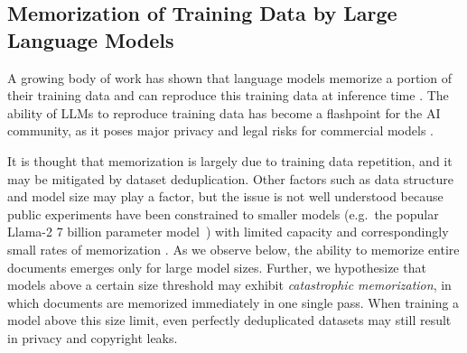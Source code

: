 
\subsection{Memorization of Training Data by Large Language Models}

A growing body of work has shown that language models memorize a portion of
their training data and can reproduce this training data at inference time
\cite{carlini2023quantifying}. The ability of LLMs to reproduce training data
has become a flashpoint for the AI community, as it poses major privacy and
legal risks for commercial models \cite{grynbaum2023times,
carlini2021extracting,carlini2023quantifying}.

It is thought that memorization is largely due to training data repetition, and
it may be mitigated by dataset deduplication. Other factors such as data
structure and model size may play a factor, but the issue is not well
understood because public experiments have been constrained to smaller models
(e.g.~the popular Llama-2 7 billion parameter model~\cite{touvron2023llama})
with limited capacity and correspondingly small rates of memorization
\cite{carlini2023quantifying,biderman2023pythia}. As we observe below, the
ability to memorize entire documents emerges only for large model
sizes. Further, we hypothesize that models above a certain size threshold
may exhibit \textit{catastrophic memorization}, in which documents are
memorized immediately in one single pass. When training a model above this size
limit, even perfectly deduplicated datasets may still result in privacy and
copyright leaks.

